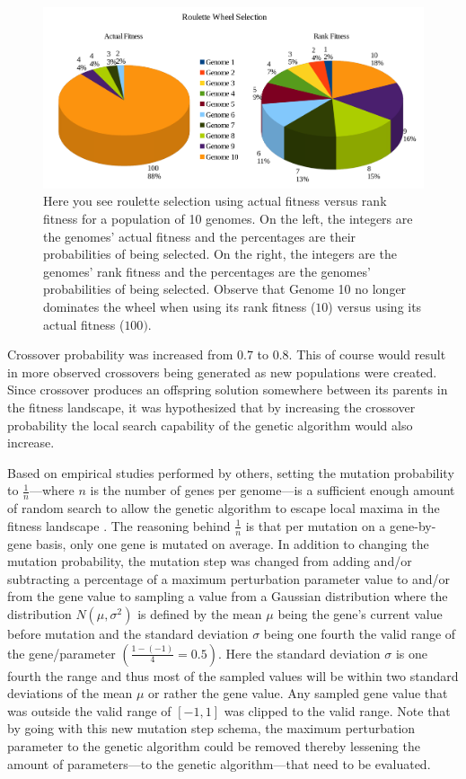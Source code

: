 \documentclass[a4paper,10pt]{article}
\begin{document}
\begin{figure}[H]  
  \centering
  \includegraphics[width=.9\textwidth]{figures/roulette.png}
  \caption{Here you see roulette selection using actual fitness versus rank fitness for a population of 10 genomes. On the left, the integers are the genomes' actual fitness and the percentages are their probabilities of being selected. On the right, the integers are the genomes' rank fitness and the percentages are the genomes' probabilities of being selected. Observe that Genome 10 no longer dominates the wheel when using its rank fitness ($10$) versus using its actual fitness ($100)$.}
  \label{fig:roulette}
\end{figure}

Crossover probability was increased from $0.7$ to $0.8$. This of course would result in more observed crossovers being generated as new populations were created. Since crossover produces an offspring solution  somewhere between its parents in the fitness landscape, it was hypothesized that by increasing the crossover probability the local search capability of the genetic algorithm would also increase.

Based on empirical studies performed by others, setting the mutation probability to $\frac{1}{n}$---where $n$ is the number of genes per genome---is a sufficient enough amount of random search to allow the genetic algorithm to escape local maxima in the fitness landscape \cite{predictive_models}. The reasoning behind $\frac{1}{n}$ is that per mutation on a gene-by-gene basis, only one gene is mutated on average. In addition to changing the mutation probability, the mutation step was changed from adding and/or subtracting a percentage of a maximum perturbation parameter value to and/or from the gene value to sampling a value from a Gaussian distribution where the distribution $N(\mu,\sigma^2)$ is defined by the mean $\mu$ being the gene's current value before mutation and the standard deviation $\sigma$ being one fourth the valid range of the gene/parameter $\left(\frac{1-(-1)}{4}=0.5 \right)$. Here the standard deviation $\sigma$ is one fourth the range and thus most of the sampled values will be within two standard deviations of the mean $\mu$ or rather the gene value. Any sampled gene value that was outside the valid range of $[-1,1]$ was clipped to the valid range. Note that by going with this new mutation step schema, the maximum perturbation parameter to the genetic algorithm could be removed thereby lessening the amount of parameters---to the genetic algorithm---that need to be evaluated. 
\end{document}
